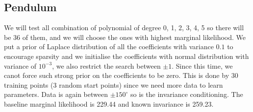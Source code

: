 \documentclass{statsmsc}
\begin{document}
\subsection{Pendulum}
We will test all combination of polynomial of degree 0, 1, 2, 3, 4, 5 so there will be 36 of them, and we will choose the ones with highest marginal likelihood.
We put a prior of Laplace distribution of all the coefficients with variance $0.1$ to encourage sparsity and we initialise the coefficients with normal distribution with variance of $10^{-3}$, we also restrict the search between $\pm 1$. Since this time, we canot force such strong prior on the coefficients to be zero. 
This is done by 30 training points (3 random start points) since we need more data to learn parameters.
Data is again between $\pm 150^{\circ}$ so is the invariance conditioning.
The baseline marginal likelihood is 229.44 and known invariance is 259.23.
\begin{flushleft}
\begin{table}[H]
  \caption{Log marginal likelihood for polynomial of different degree}
  \label{tab:pendulum_paramertised}
\end{table}
\end{flushleft}
\end{document}
